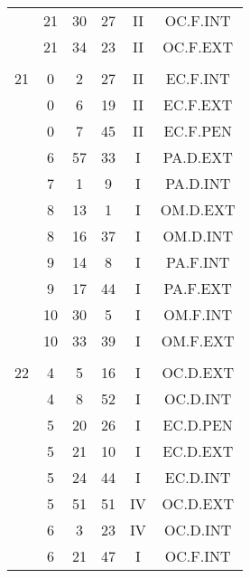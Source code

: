 \documentclass[12pt, a4paper]{article}
\begin{document}
\begin{multicols}{3}
{\begin{tabular}{c c c c c c}
	 	 	 	 & 21 & 30 & 27 & II & OC.F.INT\\%
	 	 	 	 & 21 & 34 & 23 & II & OC.F.EXT\\%
	 	 	 	 & & & & & \\%
	 	 	 	21 & 0 & 2 & 27 & II & EC.F.INT\\%
	 	 	 	 & 0 & 6 & 19 & II & EC.F.EXT\\%
	 	 	 	 & 0 & 7 & 45 & II & EC.F.PEN\\%
	 	 	 	 & 6 & 57 & 33 & I & PA.D.EXT\\%
	 	 	 	 & 7 & 1 & 9 & I & PA.D.INT\\%
	 	 	 	 & 8 & 13 & 1 & I & OM.D.EXT\\%
	 	 	 	 & 8 & 16 & 37 & I & OM.D.INT\\%
	 	 	 	 & 9 & 14 & 8 & I & PA.F.INT\\%
	 	 	 	 & 9 & 17 & 44 & I & PA.F.EXT\\%
	 	 	 	 & 10 & 30 & 5 & I & OM.F.INT\\%
	 	 	 	 & 10 & 33 & 39 & I & OM.F.EXT\\%
	 	 	 	 & & & & & \\%
	 	 	 	22 & 4 & 5 & 16 & I & OC.D.EXT\\%
	 	 	 	 & 4 & 8 & 52 & I & OC.D.INT\\%
	 	 	 	 & 5 & 20 & 26 & I & EC.D.PEN\\%
	 	 	 	 & 5 & 21 & 10 & I & EC.D.EXT\\%
	 	 	 	 & 5 & 24 & 44 & I & EC.D.INT\\%
	 	 	 	 & 5 & 51 & 51 & IV & OC.D.EXT\\%
	 	 	 	 & 6 & 3 & 23 & IV & OC.D.INT\\%
	 	 	 	 & 6 & 21 & 47 & I & OC.F.INT\\%

\end{tabular}}
\end{multicols}
\end{document}
